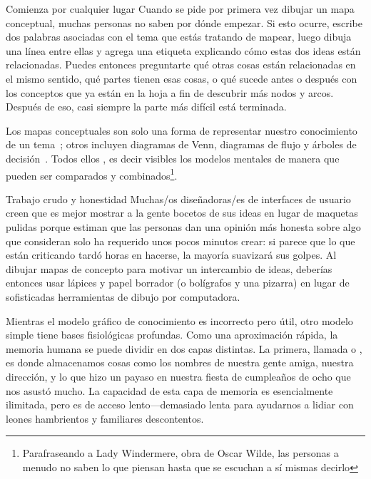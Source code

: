 \begin{aside}{Comienza por cualquier lugar}
  Cuando se pide por primera vez dibujar un mapa conceptual, muchas personas no saben por dónde empezar.
  Si esto ocurre,
  escribe dos palabras asociadas con el tema que estás tratando de mapear,
 luego dibuja una línea entre ellas y agrega una etiqueta explicando cómo estas dos ideas están relacionadas.
  Puedes entonces preguntarte qué otras cosas están relacionadas en el mismo sentido,
  qué partes tienen esas cosas,
  o qué sucede antes o después con los conceptos que ya están en la hoja
  a fin de descubrir más nodos y arcos.
  Después de eso, casi siempre la parte más difícil está terminada.
\end{aside}

Los mapas conceptuales son solo una forma de representar nuestro conocimiento de un tema~\cite{Eppl2006};
otros incluyen diagramas de Venn, diagramas de flujo y árboles de decisión~\cite{Abel2009}.
Todos ellos ,
es decir \hacen visibles los modelos mentales de manera que pueden ser comparados y combinados\footnote{Parafraseando a
 Lady Windermere, obra de Oscar Wilde,
las personas a menudo no saben lo que piensan hasta que se escuchan a sí mismas decirlo}.

\begin{aside}{Trabajo crudo y honestidad}
  Muchas/os diseñadoras/es de interfaces de usuario creen que es mejor mostrar a la gente bocetos de sus ideas en lugar de maquetas pulidas
  porque estiman que las personas dan una opinión más honesta sobre algo que 
  consideran solo ha requerido unos pocos minutos crear:
  si parece que lo que están criticando tardó horas en hacerse, 
  la mayoría suavizará sus golpes.
  Al dibujar mapas de concepto para motivar un intercambio de ideas,
  deberías entonces usar lápices y papel borrador (o bolígrafos y una pizarra)
  en lugar de sofisticadas herramientas de dibujo por computadora.
\end{aside}


Mientras el modelo gráfico de conocimiento es incorrecto pero útil,
otro modelo simple tiene bases fisiológicas profundas.
Como una aproximación rápida,
la memoria humana se puede dividir en dos capas distintas.
La primera,
llamada 
o ,
es donde almacenamos cosas como los nombres de nuestra gente amiga,
nuestra dirección,
y lo que hizo un payaso en nuestra fiesta de cumpleaños de ocho que nos asustó mucho.
La capacidad de esta capa de memoria es esencialmente ilimitada,
pero es de acceso lento---demasiado lenta para ayudarnos a lidiar con leones hambrientos  y familiares descontentos.

